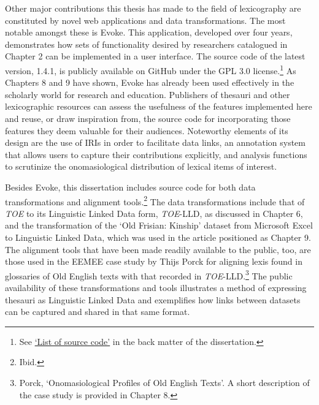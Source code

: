 Other major contributions this thesis has made to the field of lexicography are constituted by novel web applications and data transformations. The most notable amongst these is Evoke. This application, developed over four years, demonstrates how sets of functionality desired by researchers catalogued in Chapter 2 can be implemented in a user interface. The source code of the latest version, 1.4.1, is publicly available on GitHub under the GPL 3.0 license.\footnote{See \hyperref[fm:sourcecode]{`List of source code'} in the back matter of the dissertation.} As Chapters 8 and 9 have shown, Evoke has already been used effectively in the scholarly world for research and education. Publishers of thesauri and other lexicographic resources can assess the usefulness of the features implemented here and reuse, or draw inspiration from, the source code for incorporating those features they deem valuable for their audiences. Noteworthy elements of its design are the use of IRIs in order to facilitate data links, an annotation system that allows users to capture their contributions explicitly, and analysis functions to scrutinize the onomasiological distribution of lexical items of interest.



Besides Evoke, this dissertation includes source code for both data transformations and alignment tools.\footnote{Ibid.} The data transformations include that of \textit{TOE} to its Linguistic Linked Data form, \textit{TOE}-LLD, as discussed in Chapter 6, and the transformation of the `Old Frisian: Kinship' dataset from Microsoft Excel to Linguistic Linked Data, which was used in the article positioned as Chapter 9. The alignment tools that have been made readily available to the public, too, are those used in the EEMEE case study by Thijs Porck for aligning lexis found in glossaries of Old English texts with that recorded in \textit{TOE}-LLD.\footnote{Porck, `Onomasiological Profiles of Old English Texts'. A short description of the case study is provided in Chapter 8.} The public availability of these transformations and tools illustrates a method of expressing thesauri as Linguistic Linked Data and exemplifies how links between datasets can be captured and shared in that same format.



